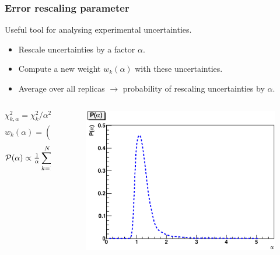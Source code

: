 \documentclass[10pt]{beamer}
\newcommand{\be}{\begin{equation*}}
\newcommand{\ee}{\end{equation*}}
\def\smallfrac#1#2{\hbox{${{#1}\over {#2}}$}}
\begin{document}
\begin{frame}
\frametitle{Error rescaling parameter}
Useful tool for analysing experimental uncertainties.
\begin{itemize}
		\item<1-> Rescale uncertainties by a factor $\alpha$.
		\item<1-> Compute a new weight $w_k(\alpha)$ with these uncertainties.
		\item<1-> Average over all replicas $\to$ probability of rescaling uncertainties by $\alpha$.
\end{itemize}


\begin{columns}
  \begin{column}{0.5\textwidth}
  \begin{block}{}
\be \chi^2_{k,\alpha} = \chi^2_k/\alpha^2, \ee
\be w_k(\alpha) = (\chi^2_{k,\alpha})^{(n-1)/2}\mathrm{e}^{-\chi^2_{k,\alpha}/2,}\ee
\be \mathcal{P}(\alpha)\propto \smallfrac{1}{\alpha}\sum_{k=1}^N w_k(\alpha).\ee
\end{block}
  \end{column}
  
    \begin{column}{0.5\textwidth}
 \begin{figure}[b!]
    \begin{center}
      \includegraphics[width=1\textwidth]{palpha-jets-t0.eps}
    \end{center}
\end{figure}

  \end{column}  
  \end{columns}

\begin{figure}[b!]
    \begin{center}
    \end{center}
    \vskip-0.5cm

\end{figure}



\end{frame}
\end{document}
